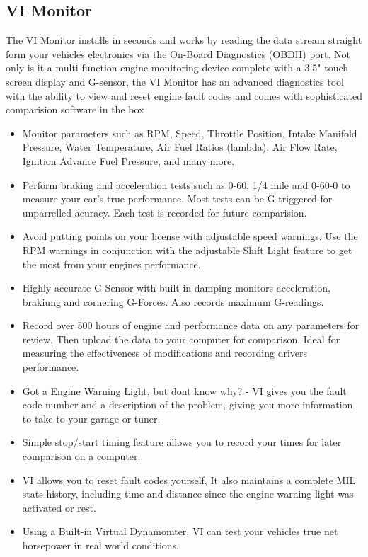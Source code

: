 \subsection{VI Monitor}
The VI Monitor installs in seconds and works by reading the data stream straight form your vehicles electronics 
via the On-Board Diagnostics (OBDII) port. Not only is it a multi-function engine monitoring device complete with a 3.5" touch screen display and G-sensor, the VI Monitor has an advanced diagnostics tool with the ability to view and reset engine fault codes and comes with sophisticated comparision software in the box\\
\begin{itemize}
\item Monitor parameters such as RPM, Speed, Throttle Position, Intake Manifold Pressure, Water Temperature, 
Air Fuel Ratios (lambda), Air Flow Rate, Ignition Advance Fuel Pressure, and many more.
\item Perform braking and acceleration tests such as 0-60, 1/4 mile and 0-60-0 to measure your car's true 
performance. Most tests can be G-triggered for unparrelled acuracy. Each test is recorded for future comparision.
\item Avoid putting points on your license with adjustable speed warnings. Use the RPM warnings in conjunction with the adjustable Shift Light feature to get the most from your engines performance.
\item Highly accurate G-Sensor with built-in damping monitors acceleration, brakiung and cornering G-Forces. Also records maximum G-readings.
\item Record over 500 hours of engine and performance data on any parameters for review. Then upload the data to your computer for comparison. Ideal for measuring the effectiveness of modifications and recording drivers performance.
\item Got a Engine Warning Light, but dont know why? - VI gives you the fault code number and a description of the problem, giving you more information to take to your garage or tuner.
\item Simple stop/start timing feature allows you to record your times for later comparison on a computer.
\item VI allows you to reset fault codes yourself, It also maintains a complete MIL stats history, including time and distance since the engine warning light was activated or rest.
\item Using a Built-in Virtual Dynamomter, VI can test your vehicles true net horsepower in real world conditions.
\end{itemize}

